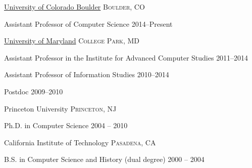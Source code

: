 \documentclass[10pt,a4paper]{article} %
\begin{document}


\headedsection
{\href{http://cs.colorado.edu/}{University of Colorado Boulder}}
{\textsc{Boulder, CO}} {

\headedsubsection %
{Assistant Professor of Computer Science}
{2014--Present}
{}
}


\headedsection %
{\href{http://umiacs.umd.edu}{University of Maryland}}
{\textsc{College Park, MD}} {

\headedsubsection %
{Assistant Professor in the Institute for Advanced Computer Studies}
{2011--2014}
{}


\headedsubsection %
{Assistant Professor of Information Studies}
{2010--2014}
{}

\headedsubsection %
{Postdoc}
{2009--2010}
{}

}

\spacedhrule{-0.2em}{-0.4em} %



\headedsection %
{Princeton University}
{\textsc{Princeton, NJ}} {

\headedsubsection %
{Ph.D. in Computer Science}
{2004 -- 2010}
{}
}


\headedsection %
{California Institute of Technology}
{\textsc{Pasadena, CA}} {

\headedsubsection %
{B.S. in Computer Science and History (dual degree)}
{2000 -- 2004} {}
}
\end{document}
